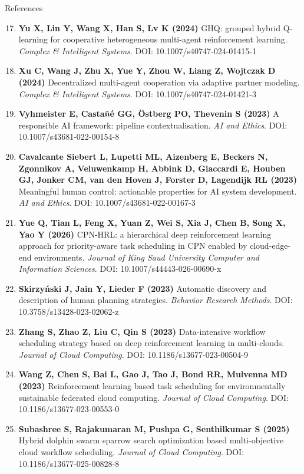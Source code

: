 \documentclass[aspectratio=169,10pt]{beamer}
\begin{document}
\begin{frame}{References}
\scriptsize
{}
\begin{enumerate}\setcounter{enumi}{16}\itemsep0.22em\leftskip=-0.55em
\item \textbf{Yu X, Lin Y, Wang X, Han S, Lv K (2024)} GHQ: grouped hybrid Q-learning for cooperative heterogeneous multi-agent reinforcement learning. \textit{Complex \& Intelligent Systems}. DOI: 10.1007/s40747-024-01415-1
\item \textbf{Xu C, Wang J, Zhu X, Yue Y, Zhou W, Liang Z, Wojtczak D (2024)} Decentralized multi-agent cooperation via adaptive partner modeling. \textit{Complex \& Intelligent Systems}. DOI: 10.1007/s40747-024-01421-3
\item \textbf{Vyhmeister E, Casta\~n\'e GG, \"Ostberg PO, Thevenin S (2023)} A responsible AI framework: pipeline contextualisation. \textit{AI and Ethics}. DOI: 10.1007/s43681-022-00154-8
\item \textbf{Cavalcante Siebert L, Lupetti ML, Aizenberg E, Beckers N, Zgonnikov A, Veluwenkamp H, Abbink D, Giaccardi E, Houben GJ, Jonker CM, van den Hoven J, Forster D, Lagendijk RL (2023)} Meaningful human control: actionable properties for AI system development. \textit{AI and Ethics}. DOI: 10.1007/s43681-022-00167-3
\item \textbf{Yue Q, Tian L, Feng X, Yuan Z, Wei S, Xia J, Chen B, Song X, Yao Y (2026)} CPN-HRL: a hierarchical deep reinforcement learning approach for priority-aware task scheduling in CPN enabled by cloud-edge-end environments. \textit{Journal of King Saud University Computer and Information Sciences}. DOI: 10.1007/s44443-026-00690-x
\item \textbf{Skirzy\'{n}ski J, Jain Y, Lieder F (2023)} Automatic discovery and description of human planning strategies. \textit{Behavior Research Methods}. DOI: 10.3758/s13428-023-02062-z
\item \textbf{Zhang S, Zhao Z, Liu C, Qin S (2023)} Data-intensive workflow scheduling strategy based on deep reinforcement learning in multi-clouds. \textit{Journal of Cloud Computing}. DOI: 10.1186/s13677-023-00504-9
\item \textbf{Wang Z, Chen S, Bai L, Gao J, Tao J, Bond RR, Mulvenna MD (2023)} Reinforcement learning based task scheduling for environmentally sustainable federated cloud computing. \textit{Journal of Cloud Computing}. DOI: 10.1186/s13677-023-00553-0
\item \textbf{Subashree S, Rajakumaran M, Pushpa G, Senthilkumar S (2025)} Hybrid dolphin swarm sparrow search optimization based multi-objective cloud workflow scheduling. \textit{Journal of Cloud Computing}. DOI: 10.1186/s13677-025-00828-8
\end{enumerate}
\end{frame}
\end{document}
